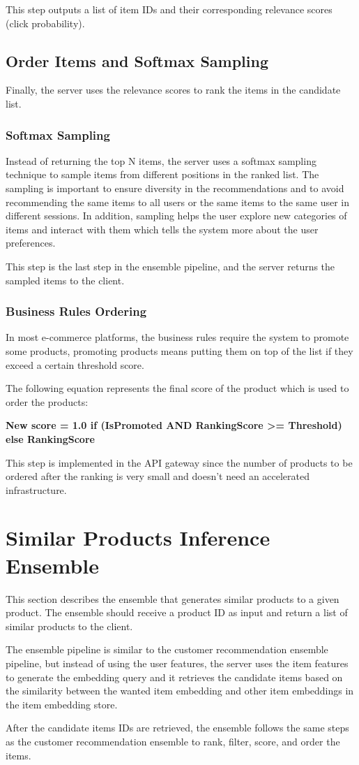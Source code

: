 This step outputs a list of item IDs and their corresponding relevance scores (click probability).

\subsection{Order Items and Softmax Sampling}

Finally, the server uses the relevance scores to rank the items in the candidate list. 

\subsubsection{Softmax Sampling}

Instead of returning the top N items, the server uses a softmax sampling technique to sample items from different positions in the ranked list.
The sampling is important to ensure diversity in the recommendations and to avoid recommending the same items to all users or the same items to the same user in different sessions.
In addition, sampling helps the user explore new categories of items and interact with them which tells the system more about the user preferences.

This step is the last step in the ensemble pipeline, and the server returns the sampled items to the client.

\subsubsection{Business Rules Ordering}

In most e-commerce platforms, the business rules require the system to promote some products,
promoting products means putting them on top of the list if they exceed a certain threshold score.

The following equation represents the final score of the product which is used to order the products:

\textbf{New score = { 1.0  if (IsPromoted AND RankingScore >= Threshold) else RankingScore }}

This step is implemented in the API gateway since the number of products to be ordered after the ranking is very small and doesn't need an accelerated infrastructure.


\section{Similar Products Inference Ensemble}

This section describes the ensemble that generates similar products to a given product.
The ensemble should receive a product ID as input and return a list of similar products to the client.

The ensemble pipeline is similar to the customer recommendation ensemble pipeline, but instead of using the user features, the server uses the item features to generate the embedding query and it retrieves the candidate items based on the similarity between the wanted item embedding and other item embeddings in the item embedding store.

After the candidate items IDs are retrieved, the ensemble follows the same steps as the customer recommendation ensemble to rank, filter, score, and order the items.